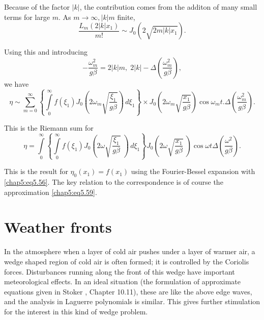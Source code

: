 Because of the factor $|k|$, the contribution comes from the additon of many small terms for large $m$. As $m\to\infty, |k|m$ finite,
\begin{equation}
\frac{L_m\left(2|k|x_1\right)}{m!}\sim J_0\left(2\sqrt{2m|k|x_1}\right). \tag{5.59}\label{chap5:eq5.59}
\end{equation}

Using this and introducing 
$$
-\frac{\omega_m^2}{g\beta}=2|k|m,\; 2|k|-\Delta\left(\frac{\omega_m^2}{g\beta} \right),
$$
we have 
{\fontsize{10}{12}\selectfont
$$
\eta\sim\sum\limits_{m=0}^\infty\left\{\int\limits_0^\infty
f(\xi_1)J_0 \left(2 \omega_m
\sqrt{\frac{\xi_1}{g\beta}}\right)\,d\xi_1\right\}\times J_0\left(2
\omega_m \sqrt{\frac{x_1}{g\beta}}\right)\cos\omega_m t.\Delta\left(
\frac{\omega_m^2}{g\beta}\right). 
$$}

This is the Riemann sum for 
$$
\eta=\int\limits_0^\infty\left\{\int\limits_0^\infty f(\xi_1)J_0\left(2\omega \sqrt{\frac{\xi_1}{g\beta}} \; \right)\,d\xi_1\right\}J_0\left(2\omega \sqrt{\frac{x_1}{g\beta}} \; \right)\cos \omega t\Delta\left(\frac{\omega^2} {g\beta}\right).
$$

This is the result for $\eta_0(x_1)=f(x_1)$ using the Fourier-Bessel expansion with \eqref{chap5:eq5.56}. The key relation to the correspondence is of course the approximation \eqref{chap5:eq5.59}.

\section{Weather fronts}\label{chap5:sec5.8}\pageoriginale 

In the atmosphere when a layer of cold air pushes under a layer of warmer air, a wedge shaped region of cold air is often formed; it is controlled by the Coriolis forces. Disturbances running along the front of this wedge have important meteorological effects. In an ideal situation (the formulation of approximate equations given in Stoker \cite{key10}, Chapter 10.11), these are like the above edge waves, and the analysis in Laguerre polynomials is similar. This gives further stimulation for the interest in this kind of wedge problem.

